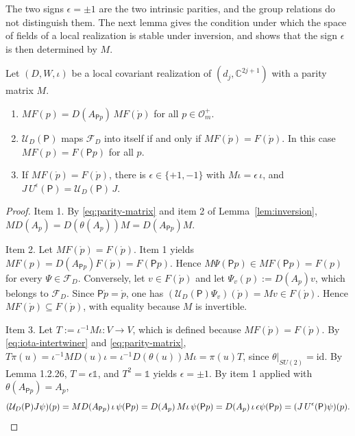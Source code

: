 \noindent The two signs $\epsilon=\pm1$ are the two intrinsic parities, and the group relations do not distinguish them. The next lemma gives the condition under which the space of fields of a local realization is stable under inversion, and shows that the sign $\epsilon$ is then determined by $M$.

\begin{lemma}\label{lem:parity-stable}
	Let $(D,W,\iota)$ be a local covariant realization of $(d_j,\mathbb{C}^{2j+1})$ with a parity matrix $M$.
	\begin{enumerate}
		\item $MF(p)=D(A_{\mathsf{P}p})\,MF(\mathring{p})$ for all $p\in\mathcal{O}_m^+$.
		\item $\mathcal{U}_D(\mathsf{P})$ maps $\mathcal{F}_D$ into itself if and only if $MF(\mathring{p})=F(\mathring{p})$. In this case $MF(p)=F(\mathsf{P}p)$ for all $p$.
		\item If $MF(\mathring{p})=F(\mathring{p})$, there is $\epsilon\in\{+1,-1\}$ with $M\iota=\epsilon\,\iota$, and $J\,U^\epsilon(\mathsf{P})=\mathcal{U}_D(\mathsf{P})\,J$.
	\end{enumerate}
\end{lemma}

\begin{proof}
	Item 1. By \eqref{eq:parity-matrix} and item 2 of Lemma~\ref{lem:inversion}, $MD(A_p)=D(\theta(A_p))M=D(A_{\mathsf{P}p})M$.
	
	Item 2. Let $MF(\mathring{p})=F(\mathring{p})$. Item 1 yields $MF(p)=D(A_{\mathsf{P}p})F(\mathring{p})=F(\mathsf{P}p)$. Hence $M\Psi(\mathsf{P}p)\in MF(\mathsf{P}p)=F(p)$ for every $\Psi\in\mathcal{F}_D$. Conversely, let $v\in F(\mathring{p})$ and let $\Psi_v(p):=D(A_p)v$, which belongs to $\mathcal{F}_D$. Since $\mathsf{P}\mathring{p}=\mathring{p}$, one has $(\mathcal{U}_D(\mathsf{P})\Psi_v)(\mathring{p})=Mv\in F(\mathring{p})$. Hence $MF(\mathring{p})\subseteq F(\mathring{p})$, with equality because $M$ is invertible.
	
	Item 3. Let $T:=\iota^{-1}M\iota:V\to V$, which is defined because $MF(\mathring{p})=F(\mathring{p})$. By \eqref{eq:iota-intertwiner} and \eqref{eq:parity-matrix}, $T\pi(u)=\iota^{-1}MD(u)\iota=\iota^{-1}D(\theta(u))M\iota=\pi(u)T$, since $\theta|_{SU(2)}=\mathrm{id}$. By Lemma 1.2.26, $T=\epsilon\mathbb{1}$, and $T^2=\mathbb{1}$ yields $\epsilon=\pm1$. By item 1 applied with $\theta(A_{\mathsf{P}p})=A_p$,
	\begin{equation*}
		(\mathcal{U}_D(\mathsf{P})J\psi)(p)=MD(A_{\mathsf{P}p})\,\iota\,\psi(\mathsf{P}p)=D(A_p)\,M\iota\,\psi(\mathsf{P}p)=D(A_p)\,\iota\,\epsilon\psi(\mathsf{P}p)=(J\,U^\epsilon(\mathsf{P})\psi)(p).\qedhere
	\end{equation*}
\end{proof}

